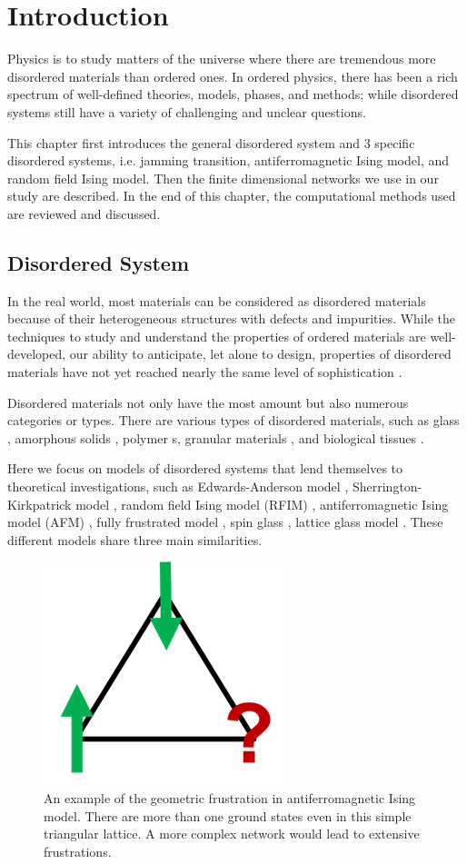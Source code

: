 \chapter{Introduction}
\label{chap-intro}

Physics is to study matters of the universe where 
there are tremendous more disordered materials than ordered ones.
In ordered physics, there has been a rich spectrum of 
well-defined theories, models, phases, and methods; while disordered 
systems still have a variety of challenging and unclear questions. 

This chapter first introduces the general disordered system and 3 specific disordered systems, i.e. jamming transition, antiferromagnetic Ising model, and random field Ising model. Then the finite dimensional networks we use in our study are described. In the end of this chapter, the computational methods used are reviewed and discussed.

\section{Disordered System}
In the real world, most materials can be considered as disordered materials because of their heterogeneous structures with defects and impurities. While the techniques to study and understand the properties of ordered materials are well-developed, our
ability to anticipate, let alone to design, properties of disordered materials have not yet reached nearly the same level of sophistication \cite{Kotani16Material}. 

Disordered materials not only have the most amount but also numerous categories or types. There are various types of disordered materials, such as glass \cite{Gibbs1958nature, berthier2016facets}, amorphous solids \cite{berthier2016facets}, polymer s\cite{roth2005glass}, granular materials \cite{richard2005slow}, and biological tissues \cite{bi2015density}. 

Here we focus on models of disordered systems that lend themselves to theoretical investigations, such as Edwards-Anderson model \cite{edwards1975theory}, Sherrington-Kirkpatrick model \cite{sherrington1975}, random field Ising model (RFIM) \cite{imry1975random}, antiferromagnetic Ising model (AFM) \cite{wannier1950afm},  fully frustrated model \cite{kosterlitz1973ordering, kosterlitz1974critical}, spin glass \cite{young1997spin}, lattice glass model \cite{Biroli02}. These different models share  three main similarities. 
\begin{figure}[h]
\centering \includegraphics[width=0.2\columnwidth]{Chapter-1/geo_frustration.png} 
\protect\caption{\label{fig:intro-gf} An example of the geometric frustration in antiferromagnetic Ising model. There are more than one ground states even in this simple triangular lattice. A more complex network would lead to extensive frustrations.}
\end{figure}

